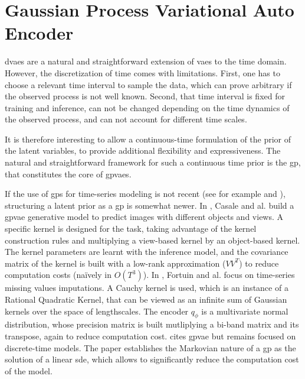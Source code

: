 \chapter{Gaussian Process Variational Auto Encoder}\label{sec:Gaussian Process VAE}

\glspl{dvae} are a natural and straightforward extension of \glspl{vae} to the time domain. However, the discretization of time comes with limitations. First, one has to choose a relevant time interval to sample the data, which can prove arbitrary if the observed process is not well known. Second, that time interval is fixed for training and inference, can not be changed depending on the time dynamics of the observed process, and can not account for different time scales.

It is therefore interesting to allow a continuous-time formulation of the prior of the latent variables, to provide additional flexibility and expressiveness. The natural and straightforward framework for such a continuous time prior is the \gls{gp}, that constitutes the core of \glspl{gpvae}.

If the use of \glspl{gp} for time-series modeling is not recent (see for example \cite{rasmussen_gaussian_2008} and \cite{roberts_gaussian_2013}), structuring a latent prior as a \gls{gp} is somewhat newer. In \cite{casale_gaussian_2018}, Casale and al. build a \gls{gpvae} generative model to predict images with different objects and views. A specific kernel is designed for the task, taking advantage of the kernel construction rules and multiplying a view-based kernel by an object-based kernel. The kernel parameters are learnt with the inference model, and the covariance matrix of the kernel is built with a low-rank approximation ($VV^T$) to reduce computation costs (naïvely in $O(T^3)$). In \cite{fortuin_gp-vae:_2020}, Fortuin and al. focus on time-series missing values imputations. A Cauchy kernel is used, which is an instance of a Rational Quadratic Kernel, that can be viewed as an infinite sum of Gaussian kernels over the space of lengthscales. The encoder $q_\phi$ is a multivariate normal distribution, whose precision matrix is built mutliplying a bi-band matrix and its transpose, again to reduce computation cost. \cite{girin_dynamical_2022} cites \gls{gpvae} but remains focused on discrete-time models. The paper \cite{zhu_markovian_2023} establishes the Markovian nature of a \gls{gp} as the solution of a linear \gls{sde}, which allows to significantly reduce the computation cost of the model. 

